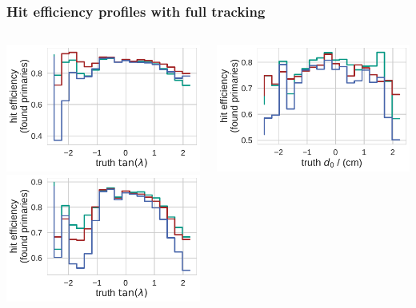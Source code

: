 \documentclass[18pt, aspectratio=169]{beamer}
\begin{document}
\begin{frame}
\begin{columns}
\begin{column}{.5\textwidth}
    \end{column}
  \end{columns}
\end{frame}

\begin{frame}
  \frametitle{Hit efficiency profiles with full tracking}
  \begin{columns}
    \begin{column}{.5\textwidth}
      \centering
      \includegraphics[width=.60\textwidth]{figures/hiteff_on_matched_by_tan_lambda_truth_trainedWithFakes.pdf}\\
      \includegraphics[width=.60\textwidth]{figures/hiteff_on_matched_by_tan_lambda_truth_fullreco_trainedWithFakes.pdf}
    \end{column}    
    \begin{column}{.5\textwidth}
      \centering
      \includegraphics[width=.60\textwidth]{figures/hiteff_on_matched_by_d0_truth_fullreco_trainedWithFakes.pdf}\\

\end{column}
\end{columns}
\end{frame}
\end{document}
